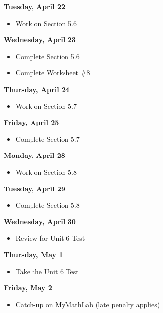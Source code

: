 \documentclass[11pt]{article}
\begin{document}
\textbf{Tuesday, April 22}

\begin{itemize}
\item Work on Section 5.6
\end{itemize}

\textbf{Wednesday, April 23}

\begin{itemize}
\item Complete Section 5.6
\item Complete Worksheet \#8
\end{itemize}

\textbf{Thursday, April 24}

\begin{itemize}
\item Work on Section 5.7
\end{itemize}

\textbf{Friday, April 25}

\begin{itemize}
\item Complete Section 5.7
\end{itemize}

\textbf{Monday, April 28}

\begin{itemize}
\item Work on Section 5.8
\end{itemize}

\textbf{Tuesday, April 29}

\begin{itemize}
\item Complete Section 5.8
\end{itemize}

\textbf{Wednesday, April 30}

\begin{itemize}
\item Review for Unit 6 Test
\end{itemize}

\textbf{Thursday, May 1}

\begin{itemize}
\item Take the Unit 6 Test
\end{itemize}

\textbf{Friday, May 2}

\begin{itemize}
\item Catch-up on MyMathLab (late penalty applies)
\end{itemize}
\end{document}
